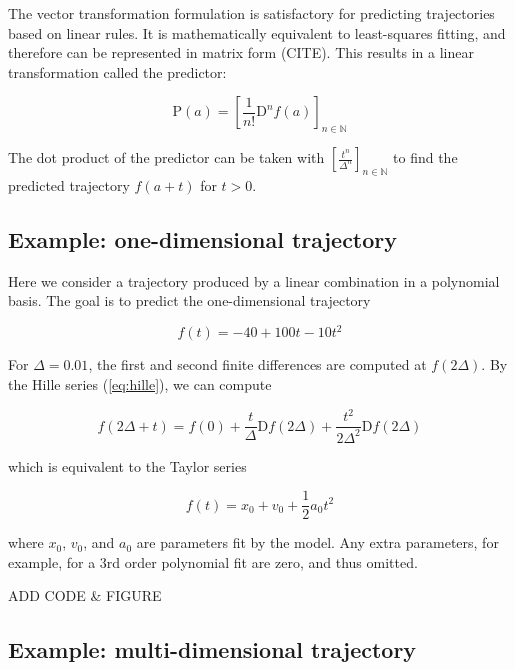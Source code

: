 \documentclass{article}
\begin{document}
The vector transformation formulation is satisfactory for predicting trajectories
based on linear rules.
It is mathematically equivalent to least-squares fitting, and therefore can be represented in matrix form (CITE).
This results in a linear transformation called the predictor:

\begin{equation}
  \mathrm{P}(a) = \left[ \frac{1}{n!} \mathrm{D}^n f(a) \right]_{n \in \mathbb{N}}
\end{equation}

The dot product of the predictor can be taken with $\left[ \frac{t^n}{\Delta^n} \right]_{n \in \mathbb{N}}$
to find the predicted trajectory $f(a + t)$ for $t > 0$.

\subsection{Example: one-dimensional trajectory}

Here we consider a trajectory produced by a linear combination in a polynomial basis.
The goal is to predict the one-dimensional trajectory

\begin{equation}
  f(t) = -40 + 100 t - 10 t^2
\end{equation}

For $\Delta = 0.01$, the first and second finite differences
are computed at $f(2\Delta)$.
By the Hille series (\ref{eq:hille}), we can compute

\begin{equation}
	f(2\Delta + t) = f(0) + \frac{t}{\Delta} \mathrm{D}f(2\Delta) + \frac{t^2}{2 \Delta^2} \mathrm{D}f(2\Delta)
\end{equation}

which is equivalent to the Taylor series

\begin{equation}
  f(t) = x_0 + v_0 + \frac{1}{2} a_0 t^2
\end{equation}

where $x_0$, $v_0$, and $a_0$ are parameters fit by the model.
Any extra parameters, for example, for a 3rd order polynomial fit are zero, and thus omitted.

ADD CODE \& FIGURE

\subsection{Example: multi-dimensional trajectory}
\end{document}
